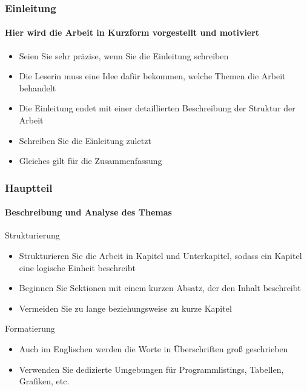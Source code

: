 \begin{frame}
\frametitle{Einleitung}  
\framesubtitle{Hier wird die Arbeit in Kurzform vorgestellt und motiviert}

\begin{itemize}
\item<2-> Seien Sie sehr präzise, wenn Sie die Einleitung schreiben
\item<3-> Die Leserin muss eine Idee dafür bekommen, welche Themen die Arbeit behandelt
\item<4-> Die Einleitung endet mit einer detaillierten Beschreibung der Struktur
der Arbeit
\item<5-> Schreiben Sie die Einleitung zuletzt
\item<6-> Gleiches gilt für die Zusammenfassung
\end{itemize}

\medskip
{}
\begin{Beispiel}  
\end{Beispiel}
\end{frame}

\begin{frame}
\frametitle{Hauptteil}  
\framesubtitle{Beschreibung und Analyse des Themas}

\begin{mybox}{Strukturierung}
\begin{itemize}
\item<2-> Strukturieren Sie die Arbeit in Kapitel und Unterkapitel, sodass ein Kapitel
  eine logische Einheit beschreibt
\item<3-> Beginnen Sie Sektionen mit einem kurzen Absatz, der den Inhalt
  beschreibt
\item<4-> Vermeiden Sie zu lange beziehungsweise zu kurze Kapitel
\end{itemize}
\end{mybox}

\bigskip
\begin{mybox}{Formatierung}
  \begin{itemize}
  \item<5-> Auch im Englischen werden die Worte in Überschriften 
groß geschrieben
  \item<6-> Verwenden Sie dedizierte Umgebungen für Programmlistings, Tabellen, Grafiken, etc.
  \end{itemize}
\end{mybox}
\end{frame}

